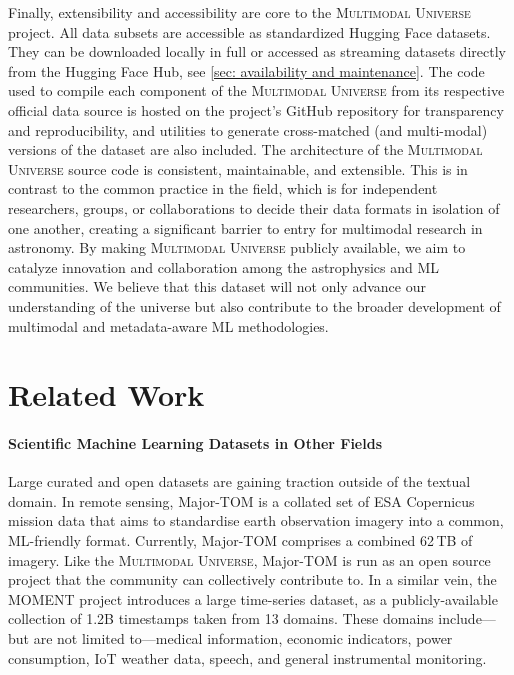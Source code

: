 \documentclass[dvipsnames,table]{article}
\newcommand\pile{\textsc{Multimodal Universe}\xspace}
\begin{document}
Finally, extensibility and accessibility are core to the \pile project.
All data subsets are accessible as standardized Hugging Face datasets. They can be downloaded locally in full or accessed as streaming datasets directly from the Hugging Face Hub, see \autoref{sec: availability and maintenance}. The code used to compile each component of the \pile from its respective official data source is hosted on the project's GitHub repository for transparency and reproducibility, and utilities to generate cross-matched (and multi-modal) versions of the dataset are also included. The architecture of the \pile source code is consistent, maintainable, and extensible.
This is in contrast to the common practice in the field, which is for independent researchers, groups, or collaborations to decide their data formats in isolation of one another, creating a significant barrier to entry for multimodal research in astronomy. By making \pile publicly available, we aim to catalyze innovation and collaboration among the astrophysics and ML communities. We believe that this dataset will not only advance our understanding of the universe but also contribute to the broader development of multimodal and metadata-aware ML methodologies.

\section{Related Work}

\paragraph{Scientific Machine Learning Datasets in Other Fields} Large curated and open datasets are gaining traction outside of the textual domain.
In remote sensing, Major-TOM \citep{francis2024} is a collated set of ESA Copernicus mission data that aims to standardise earth observation imagery into a common, ML-friendly format. Currently, Major-TOM comprises a combined 62\,TB of imagery. Like the \pile, Major-TOM is run as an open source project that the community can collectively contribute to.
In a similar vein, the MOMENT project \citep{goswami2024} introduces a large time-series dataset, as a publicly-available collection of 1.2B timestamps taken from 13 domains. These domains include---but are not limited to---medical information, economic indicators, power consumption, IoT weather data, speech, and general instrumental monitoring.
\end{document}
